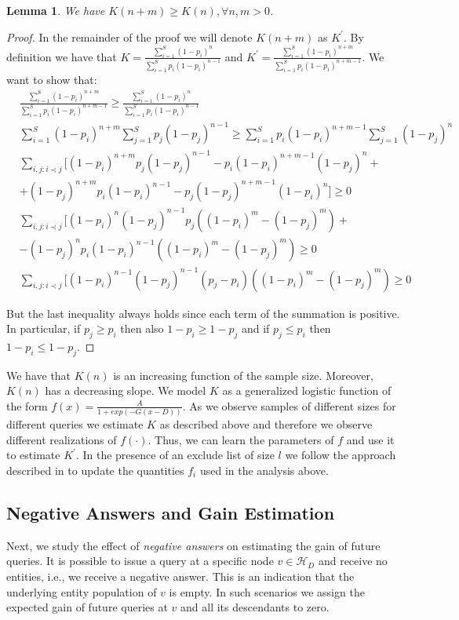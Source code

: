 \documentclass{vldb}
\newtheorem{lemma}{Lemma}
\newcommand{\hierarchy}{\mathcal{H}_D}
\begin{document}
\begin{lemma}
We have $K(n+m) \geq K(n), \forall n,m > 0$.
\end{lemma}
\begin{proof}
In the remainder of the proof we will denote $K(n+m)$ as $K^{\prime}$. By definition we have that $K = \frac{\sum_{i=1}^S (1-p_i)^n}{\sum_{i=1}^S p_i(1-p_i)^{n-1}}$ and $K^{\prime} = \frac{\sum_{i=1}^S (1-p_i)^{n+m}}{\sum_{i=1}^S p_i(1-p_i)^{n+m-1}}$. We want to show that:
{\small
\begin{align}
&\frac{\sum_{i=1}^S (1-p_i)^{n+m}}{\sum_{i=1}^S p_i(1-p_i)^{n+m-1}} \geq \frac{\sum_{i=1}^S (1-p_i)^n}{\sum_{i=1}^S p_i(1-p_i)^{n-1}} \nonumber \\
&\sum_{i=1}^S (1-p_i)^{n+m}\sum_{j=1}^S p_j(1-p_j)^{n-1} \geq \sum_{i=1}^S p_i(1-p_i)^{n+m-1}\sum_{j=1}^S (1-p_j)^n\nonumber \\
&\sum_{i,j:i\prec j}[(1-p_i)^{n+m}p_j(1-p_j)^{n-1} - p_i(1-p_i)^{n+m-1}(1-p_j)^n + \nonumber \\
& + (1-p_j)^{n+m}p_i(1-p_i)^{n-1} - p_j(1-p_j)^{n+m-1}(1-p_i)^n] \geq 0 \nonumber \\
&\sum_{i,j:i\prec j}[(1-p_i)^{n}(1-p_j)^{n-1}p_j((1-p_i)^{m} - (1-p_j)^{m})  + \nonumber \\
& - (1-p_j)^{n}p_i(1-p_i)^{n-1}((1-p_i)^{m} - (1-p_j)^{m}) \geq 0 \nonumber \\
&\sum_{i,j:i\prec j}[(1-p_i)^{n-1}(1-p_j)^{n-1}(p_j-p_i)((1-p_i)^{m} - (1-p_j)^{m}) \geq 0
\end{align}}

But the last inequality always holds since each term of the summation is positive. In particular, if $p_j \geq p_i$ then
also $1-p_i \geq 1-p_j$ and if $p_j \leq p_i$ then $1-p_i \leq 1-p_j$.
\end{proof}

We have that $K(n)$ is an increasing function of the sample size. Moreover, $K(n)$ has a decreasing slope. We model $K$ as a generalized logistic function of the form $f(x) = \frac{A}{1+exp(-G(x-D))}$. As we observe samples of different sizes for different queries we estimate $K$ as described above and therefore we observe different realizations of $f(\cdot)$. Thus, we can learn the parameters of $f$ and use it to estimate $K^{\prime}$. In the presence of an exclude list of size $l$ we follow the approach described in  to update the quantities $f_i$ used in the analysis above. 

\subsection{Negative Answers and Gain Estimation}
Next, we study the effect of {\em negative answers} on estimating the gain of future queries. It is possible to issue a query at a specific node $v \in \hierarchy$ and receive no entities, i.e., we receive a negative answer. This is an indication that the underlying entity population of $v$ is empty. In such scenarios we assign the expected gain of future queries at $v$ and all its descendants to zero. 
\end{document}

